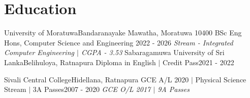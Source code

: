 \vspace{2pt}
\section{Education}
  \resumeSubHeadingListStart
    \vspace{5pt}
    \resumeSubheading
        {University of Moratuwa}{Bandaranayake Mawatha, Moratuwa 10400}
        {BSc Eng Hons, Computer Science and Engineering}
        {2022 - 2026}
        \vspace{-3pt}
      \textit{ \newline{} Stream - Integrated Computer Engineering $|$ CGPA - 3.53}
    \vspace{3pt}
    \resumeSubheading
      {Sabaragamuwa University of Sri Lanka}{Belihuloya, Ratnapura}
      {Diploma in English $|$ Credit Pass}{2021 - 2022}

    \vspace{3pt}
    \resumeSubheading
      {Sivali Central College}{Hidellana, Ratnapura}
      {GCE A/L 2020 $|$ Physical Science Stream $|$ 3A Passes}{2007 - 2020}
      \vspace{-3pt}
       \textit{ \newline{} GCE O/L 2017 $|$ 9A Passes}
  \resumeSubHeadingListEnd
